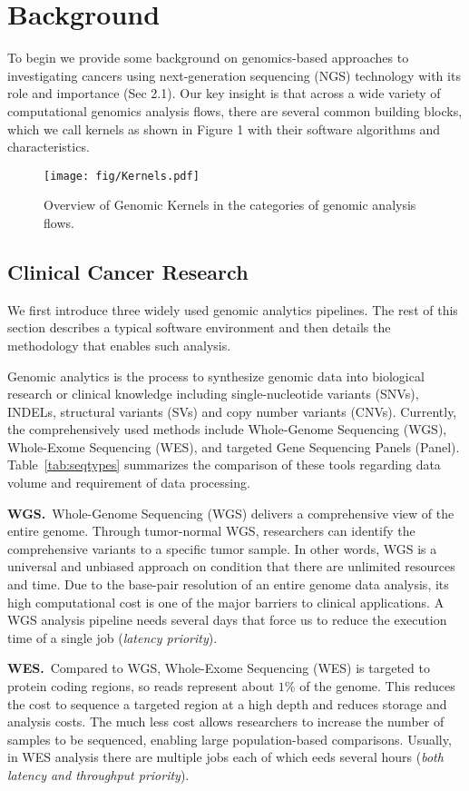 \section{Background}
\label{sec:background}
To begin we provide some background on genomics-based approaches to investigating cancers using next-generation sequencing (NGS) technology with its role and importance (Sec 2.1). Our key insight is that across a wide variety of computational genomics analysis flows, there are several common building blocks, which we call kernels as shown in Figure 1 with their software algorithms and characteristics. 
\begin{figure*}[htbp]
\centering
\texttt{[image: fig/Kernels.pdf]}
\caption{Overview of Genomic Kernels in the categories of genomic analysis flows.}
\label{fig:kernels}
\end{figure*}

\subsection{Clinical Cancer Research}
We first introduce three widely used genomic analytics pipelines. The rest of this section describes a typical software environment and then details the methodology that enables such analysis.

Genomic analytics is the process to synthesize genomic data into biological research or clinical knowledge including single-nucleotide variants (SNVs), INDELs, structural variants (SVs) and copy number variants (CNVs). Currently, the comprehensively used methods include Whole-Genome Sequencing (WGS), Whole-Exome Sequencing (WES), and targeted Gene Sequencing Panels (Panel). Table~\ref{tab:seqtypes} summarizes the comparison of these tools regarding data volume and requirement of data processing.

{\bf WGS.}~Whole-Genome Sequencing (WGS) delivers a comprehensive view of the entire genome. Through tumor-normal WGS, researchers can identify the comprehensive variants to a specific tumor sample. In other words, WGS is a universal and unbiased approach on condition that there are unlimited resources and time. Due to the base-pair resolution of an entire genome data analysis, its high computational cost is one of the major barriers to clinical applications. A WGS analysis pipeline needs several days that force us to reduce the execution time of a single job ({\em latency priority}). 

{\bf WES.}~Compared to WGS, Whole-Exome Sequencing (WES) is targeted to protein coding regions, so reads represent about $1\%$ of the genome. This reduces the cost to sequence a targeted region at a high depth and reduces storage and analysis costs. The much less cost allows researchers to increase the number of samples to be sequenced, enabling large population-based comparisons. Usually, in WES analysis there are multiple jobs each of which eeds several hours ({\em both latency and throughput priority}).

